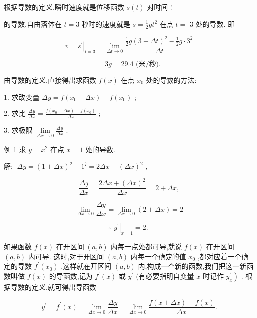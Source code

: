 \documentclass[lang=cn,newtx,12pt,scheme=chinese]{elegantbook}
\begin{document}
根据导数的定义,瞬时速度就是位移函数 \(s\left( t\right)\) 对时间 \(t\)

的导数,自由落体在 \(t = 3\) 秒时的速度就是 \(s = \frac{1}{2}g{t}^{2}\) 在点 \(t =\) 3 处的导数. 即

\[
v = {\left. {s}^{\prime }\right| }_{t = 3} = \mathop{\lim }\limits_{{{\Delta t} \rightarrow 0}}\frac{\frac{1}{2}g{\left( 3 + \Delta t\right) }^{2} - \frac{1}{2}g \cdot {3}^{2}}{\Delta t}
\]

\[
= {3g} = {29.4}\text{ (米/秒). }
\]

由导数的定义,直接得出求函数 \(f\left( x\right)\) 在点 \({x}_{0}\) 处的导数的方法:

1. 求改变量 \({\Delta y} = f\left( {{x}_{0} + {\Delta x}}\right) - f\left( {x}_{0}\right)\) ;

2. 求比 \(\frac{\Delta y}{\Delta x} = \frac{f\left( {{x}_{0} + {\Delta x}}\right) - f\left( {x}_{0}\right) }{\Delta x}\) ;

3. 求极限 \(\mathop{\lim }\limits_{{{\Delta x} \rightarrow 0}}\frac{\Delta y}{\Delta x}\) .

例 1 求 \(y = {x}^{2}\) 在点 \(x = 1\) 处的导数.

解: \(\;{\Delta y} = {\left( 1 + \Delta x\right) }^{2} - {1}^{2} = {2\Delta x} + {\left( \Delta x\right) }^{2}\) ,

\[
\frac{\Delta y}{\Delta x} = \frac{{2\Delta x} + {\left( \Delta x\right) }^{2}}{\Delta x} = 2 + {\Delta x},
\]

\[
\mathop{\lim }\limits_{{{\Delta x} \rightarrow 0}}\frac{\Delta y}{\Delta x} = \mathop{\lim }\limits_{{{\Delta x} \rightarrow 0}}\left( {2 + {\Delta x}}\right) = 2
\]

\[
\therefore {\left. \;{y}^{\prime }\right| }_{x = 1} = 2\text{. }
\]

\begin{definition}[导函数]

如果函数 \(f\left( x\right)\) 在开区间 \(\left( {a,b}\right)\) 内每一点处都可导,就说 \(f\left( x\right)\) 在开区间 \(\left( {a,b}\right)\) 内可导. 这时,对于开区间 \(\left( {a,b}\right)\) 内每一个确定的值 \({x}_{0}\) ,都对应着一个确定的导数 \({f}^{\prime }\left( {x}_{0}\right)\) ,这样就在开区间 \(\left( {a,b}\right)\) 内,构成一个新的函数,我们把这一新函数叫做 \(f\left( x\right)\) 的导函数,记为 \({f}^{\prime }\left( x\right)\) 或 \({y}^{\prime }\) (有必要指明自变量 \(x\) 时记作 \(\left. {y}_{x}^{\prime }\right)\) . 根据导数的定义,就可得出导函数

\[
{y}^{\prime } = {f}^{\prime }\left( x\right) = \mathop{\lim }\limits_{{{\Delta x} \rightarrow 0}}\frac{\Delta y}{\Delta x} = \mathop{\lim }\limits_{{{\Delta x} \rightarrow 0}}\frac{f\left( {x + {\Delta x}}\right) - f\left( x\right) }{\Delta x}. \tag{2}
\]

\end{definition}
\end{document}
